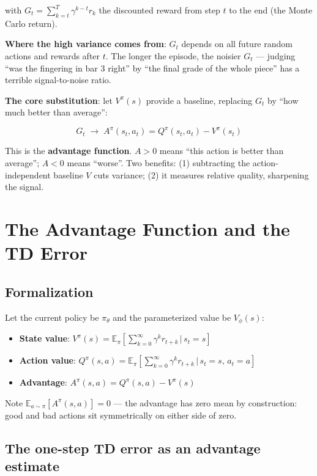 \documentclass{article}
\begin{document}
with $G_t = \sum_{k=t}^{T} \gamma^{k-t} r_k$ the discounted reward from step $t$ to the end (the Monte Carlo return).

\textbf{Where the high variance comes from}: $G_t$ depends on all future random actions and rewards after $t$. The longer the episode, the noisier $G_t$ --- judging ``was the fingering in bar 3 right'' by ``the final grade of the whole piece'' has a terrible signal-to-noise ratio.

\textbf{The core substitution}: let $V^\pi(s)$ provide a baseline, replacing $G_t$ by ``how much better than average'':

\[
\boxed{G_t \;\longrightarrow\; A^\pi(s_t, a_t) = Q^\pi(s_t, a_t) - V^\pi(s_t)}
\]

This is the \textbf{advantage function}. $A > 0$ means ``this action is better than average''; $A < 0$ means ``worse''. Two benefits: (1) subtracting the action-independent baseline $V$ cuts variance; (2) it measures relative quality, sharpening the signal.

\section*{The Advantage Function and the TD Error}

\subsection*{Formalization}

Let the current policy be $\pi_\theta$ and the parameterized value be $V_\phi(s)$:

\begin{itemize}
  \item \textbf{State value}: $V^\pi(s) = \mathbb{E}_\pi\!\left[\sum_{k=0}^{\infty} \gamma^k r_{t+k} \,\Big|\, s_t=s\right]$
  \item \textbf{Action value}: $Q^\pi(s,a) = \mathbb{E}_\pi\!\left[\sum_{k=0}^{\infty} \gamma^k r_{t+k} \,\Big|\, s_t=s,\,a_t=a\right]$
  \item \textbf{Advantage}: $A^\pi(s,a) = Q^\pi(s,a) - V^\pi(s)$
\end{itemize}

Note $\mathbb{E}_{a \sim \pi}\!\left[A^\pi(s,a)\right] = 0$ --- the advantage has zero mean by construction: good and bad actions sit symmetrically on either side of zero.

\subsection*{The one-step TD error as an advantage estimate}
\end{document}
